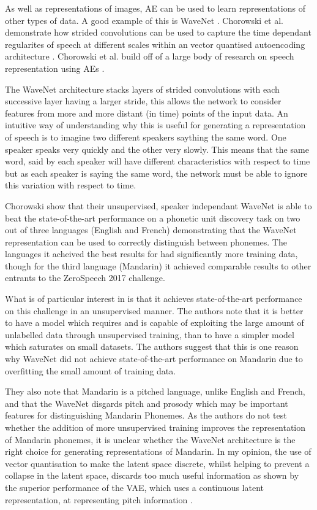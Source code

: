 As well as representations of images, \ac{AE} can be used to learn representations of other types of data. A good example of this is WaveNet \cite{wavenet}. Chorowski et al. demonstrate how strided convolutions \cite{radford2015unsupervised} can be used to capture the time dependant regularites of speech at different scales within an vector quantised autoencoding architecture \cite{van2017neural}. Chorowski et al. build off of a large body of research on speech representation using \ac{AE}s \cite{vincent2010stacked, lu2013speech}.

The WaveNet architecture stacks layers of strided convolutions with each successive layer having a larger stride, this allows the network to consider features from more and more distant (in time) points of the input data. An intuitive way of understanding why this is useful for generating a representation of speech is to imagine two different speakers saything the same word. One speaker speaks very quickly and the other very slowly. This means that the same word, said by each speaker will have different characteristics with respect to time but as each speaker is saying the same word, the network must be able to ignore this variation with respect to time.

Chorowski show that their unsupervised, speaker independant WaveNet is able to beat the state-of-the-art performance on a phonetic unit discovery task \cite{dunbar2017zero} on two out of three languages (English and French) demonstrating that the WaveNet representation can be used to correctly distinguish between phonemes. The languages it acheived the best results for had significantly more training data, though for the third language (Mandarin) it achieved comparable results to other entrants to the ZeroSpeech 2017 challenge. 

What is of particular interest in \cite{wavenet} is that it achieves state-of-the-art performance on this challenge in an unsupervised manner. The authors note that it is better to have a model which requires and is capable of exploiting the large amount of unlabelled data through unsupervised training, than to have a simpler model which saturates on small datasets. The authors suggest that this is one reason why WaveNet did not achieve state-of-the-art performance on Mandarin due to overfitting the small amount of training data.

They also note that Mandarin is a pitched language, unlike English and French, and that the WaveNet disgards pitch and prosody \cite{van2017neural} which may be important features for distinguishing Mandarin Phonemes. As the authors do not test whether the addition of more unsupervised training improves the representation of Mandarin phonemes, it is unclear whether the WaveNet architecture is the right choice for generating representations of Mandarin. In my opinion, the use of vector quantisation to make the latent space discrete, whilst helping to prevent a collapse in the latent space, discards too much useful information as shown by the superior performance of the \ac{VAE}, which uses a continuous latent representation, at representing pitch information \cite{wavenet}. 


